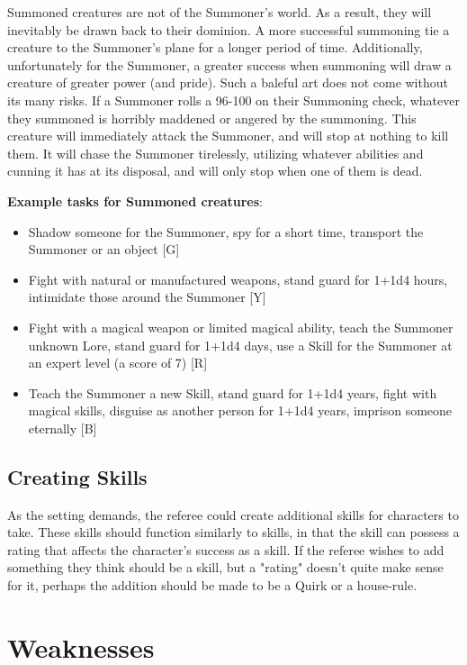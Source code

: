 \documentclass[oneside]{book}
\begin{document}
\begin{multicols}{2}
Summoned creatures are not of the Summoner's world. As a result, they will inevitably be drawn back to their dominion. A more successful summoning tie a creature to the Summoner's plane for a longer period of time. Additionally, unfortunately for the Summoner, a greater success when summoning will draw a creature of greater power (and pride). Such a baleful art does not come without its many risks. If a Summoner rolls a 96-100 on their Summoning check, whatever they summoned is horribly maddened or angered by the summoning. This creature will immediately attack the Summoner, and will stop at nothing to kill them. It will chase the Summoner tirelessly, utilizing whatever abilities and cunning it has at its disposal, and will only stop when one of them is dead.

\textbf{Example tasks for Summoned creatures}: 
	\begin{itemize}
		\setlength{\itemsep}{0cm}%
  		\setlength{\parskip}{0cm}%
		\item{ \small Shadow someone for the Summoner, spy for a short time, transport the Summoner or an object [G]}
		\item{ \small Fight with natural or manufactured weapons, stand guard for 1+1d4 hours, intimidate those around the Summoner  [Y]}
		\item{ \small Fight with a magical weapon or limited magical ability, teach the Summoner unknown Lore, stand guard for 1+1d4 days, use a Skill for the Summoner at an expert level (a score of 7) [R]}
		\item{ \small Teach the Summoner a new Skill, stand guard for 1+1d4 years, fight with magical skills, disguise as another person for 1+1d4 years, imprison someone eternally  [B]}
	\end{itemize}
	
\section{Creating Skills}
As the setting demands, the referee could create additional skills for characters to take. These skills should function similarly to skills, in that the skill can possess a rating that affects the character's success as a skill. If the referee wishes to add something they think should be a skill, but a "rating" doesn't quite make sense for it, perhaps the addition should be made to be a Quirk or a house-rule. 
\end{multicols}

\chapter{Weaknesses}
\end{document}
